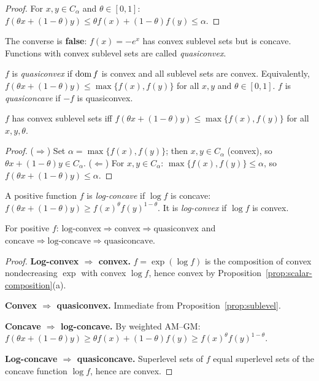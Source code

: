\documentclass[11pt,a4paper]{article}
\begin{document}
\begin{proof}
For $x, y \in C_\alpha$ and $\theta \in [0,1]$:
$f(\theta x + (1-\theta)y) \le \theta f(x) + (1-\theta) f(y) \le \alpha$.
\end{proof}

\begin{warning}
The converse is \textbf{false}: $f(x) = -e^x$ has convex sublevel sets but is
concave.  Functions with convex sublevel sets are called \emph{quasiconvex}.
\end{warning}

\begin{definition}
\label{def:quasiconvex}
$f$ is \emph{quasiconvex} if $\operatorname{dom} f$ is convex and all sublevel sets are
convex.  Equivalently, $f(\theta x + (1-\theta)y) \le \max\{f(x), f(y)\}$
for all $x, y$ and $\theta \in [0,1]$.  $f$ is \emph{quasiconcave} if $-f$ is
quasiconvex.
\end{definition}

\begin{proposition}
\label{prop:quasi-equiv}
$f$ has convex sublevel sets iff
$f(\theta x + (1-\theta)y) \le \max\{f(x), f(y)\}$ for all $x, y, \theta$.
\end{proposition}

\begin{proof}
($\Rightarrow$) Set $\alpha = \max\{f(x), f(y)\}$; then $x, y \in C_\alpha$
(convex), so $\theta x + (1-\theta)y \in C_\alpha$.
($\Leftarrow$) For $x, y \in C_\alpha$: $\max\{f(x), f(y)\} \le \alpha$,
so $f(\theta x + (1-\theta)y) \le \alpha$.
\end{proof}

\begin{definition}
\label{def:log-concave}
A positive function $f$ is \emph{log-concave} if $\log f$ is concave:
$f(\theta x + (1-\theta)y) \ge f(x)^\theta f(y)^{1-\theta}$.
It is \emph{log-convex} if $\log f$ is convex.
\end{definition}

\begin{proposition}[Hierarchy]
\label{prop:hierarchy}
For positive $f$:
$\text{log-convex} \Rightarrow \text{convex} \Rightarrow \text{quasiconvex}$
and
$\text{concave} \Rightarrow \text{log-concave} \Rightarrow
\text{quasiconcave}$.
\end{proposition}

\begin{proof}
\textbf{Log-convex $\Rightarrow$ convex.}  $f = \exp(\log f)$ is the
composition of convex nondecreasing $\exp$ with convex $\log f$, hence convex
by Proposition~\ref{prop:scalar-composition}(a).

\textbf{Convex $\Rightarrow$ quasiconvex.}  Immediate from
Proposition~\ref{prop:sublevel}.

\textbf{Concave $\Rightarrow$ log-concave.}  By weighted AM--GM:
$f(\theta x + (1-\theta)y) \ge \theta f(x) + (1-\theta) f(y) \ge
f(x)^\theta f(y)^{1-\theta}$.

\textbf{Log-concave $\Rightarrow$ quasiconcave.}  Superlevel sets of $f$
equal superlevel sets of the concave function $\log f$, hence are convex.
\end{proof}
\end{document}
